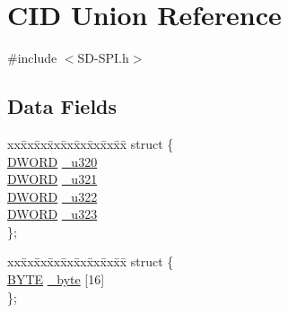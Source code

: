 \hypertarget{union_c_i_d}{}\section{C\+I\+D Union Reference}
\label{union_c_i_d}


{\ttfamily \#include $<$S\+D-\/\+S\+P\+I.\+h$>$}

\subsection*{Data Fields}
\begin{DoxyCompactItemize}
\item 
\begin{tabbing}
xx\=xx\=xx\=xx\=xx\=xx\=xx\=xx\=xx\=\kill
struct \{\\
\>\hyperlink{_generic_type_defs_8h_ad342ac907eb044443153a22f964bf0af}{DWORD} \hyperlink{union_c_i_d_a446384ca0781a9e9ed10e276b4a58701}{\_u320}\\
\>\hyperlink{_generic_type_defs_8h_ad342ac907eb044443153a22f964bf0af}{DWORD} \hyperlink{union_c_i_d_afcfcec75ab1ad51ac055518c4e4481b1}{\_u321}\\
\>\hyperlink{_generic_type_defs_8h_ad342ac907eb044443153a22f964bf0af}{DWORD} \hyperlink{union_c_i_d_a35670bdcd4d10351e71df6cd3d3ac95b}{\_u322}\\
\>\hyperlink{_generic_type_defs_8h_ad342ac907eb044443153a22f964bf0af}{DWORD} \hyperlink{union_c_i_d_a48410d35cd59cf3964706daf7c80d8fa}{\_u323}\\
\}; \\

\end{tabbing}\item 
\begin{tabbing}
xx\=xx\=xx\=xx\=xx\=xx\=xx\=xx\=xx\=\kill
struct \{\\
\>\hyperlink{_generic_type_defs_8h_a4ae1dab0fb4b072a66584546209e7d58}{BYTE} \hyperlink{union_c_i_d_a89bb97022529d46ff9cac7274a7b9faa}{\_byte} \mbox{[}16\mbox{]}\\
\}; \\


\end{tabbing}
\end{DoxyCompactItemize}
